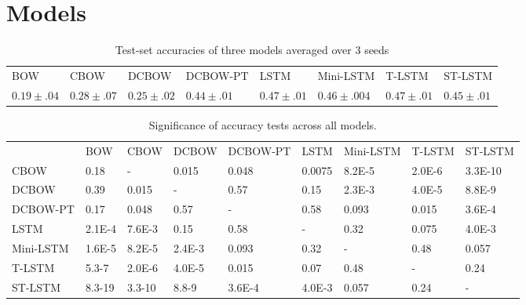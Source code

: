 \section{Models}
\label{sec: models}

\begin{table*}[t]
    \centering
    \small
    \begin{tabular}{llllllll}
    BOW  & CBOW & DCBOW & DCBOW-PT & LSTM & Mini-LSTM & T-LSTM & ST-LSTM \\
    $0.19\pm .04$ & $0.28\pm .07$ & $0.25\pm .02$ & $0.44\pm .01$ & $0.47\pm .01$ & $0.46\pm .004$ & $0.47\pm .01$ & $0.45\pm .01$ 
    \end{tabular}
    \label{table: results-acc}
    \caption{Test-set accuracies of three models averaged over 3 seeds}
\end{table*}


\begin{table*}[t]
    \small
    \begin{tabular}{lllllllll}
                     & BOW     & CBOW     & DCBOW  & DCBOW-PT   & LSTM    &
                     Mini-LSTM & T-LSTM & ST-LSTM \\
        CBOW         & 0.18  &   -   & 0.015  & 0.048 &0.0075&8.2E-5 & 2.0E-6 &3.3E-10     \\
        DCBOW    & 0.39   &  0.015   &  -    &  0.57  & 0.15  & 2.3E-3  & 4.0E-5 & 8.8E-9     \\
        DCBOW-PT & 0.17  &   0.048  &   0.57  &   -  &  0.58 &  0.093  &   0.015  & 3.6E-4 \\
        LSTM         & 2.1E-4 &  7.6E-3 &  0.15  &  0.58 & -  &  0.32  &  0.075  & 4.0E-3      \\
        Mini-LSTM    & 1.6E-5 &  8.2E-5 &  2.4E-3  &  0.093  &  0.32  &   -    &    0.48   &  0.057     \\
        T-LSTM    & 5.3-7  & 2.0E-6 & 4.0E-5 &  0.015  & 0.07  &   0.48   &    -    &   0.24     \\
        ST-LSTM & 8.3-19  &  3.3-10  &  8.8-9  & 3.6E-4 & 4.0E-3 &  0.057   &    0.24   &   -       
        \end{tabular}
    \label{table: sign}
    \caption{Significance of accuracy tests across all models.}
\end{table*}